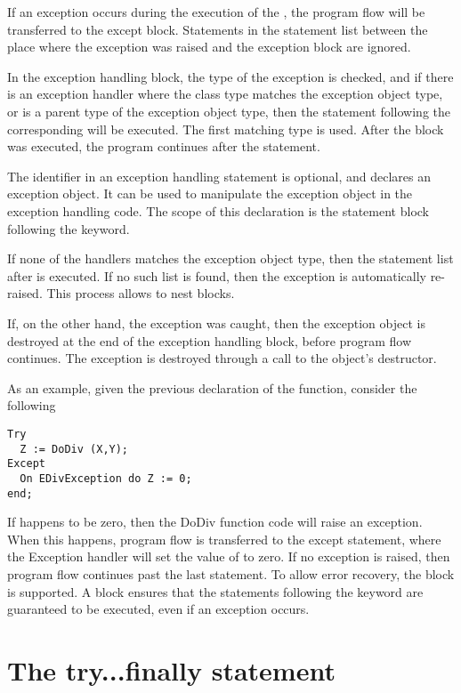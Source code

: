 If an exception occurs during the execution of the , the
program flow will be transferred to the except block. Statements in the
statement list between the place where the exception was raised and the
exception block are ignored.

In the exception handling block, the type of the exception is checked,
and if there is an exception handler where the class type matches the
exception object type, or is a parent type of
the exception object type, then the statement following the corresponding
 will be executed. The first matching type is used. After the
 block was executed, the program continues after the 
statement.

The identifier in an exception handling statement is optional, and declares
an exception object. It can be used to manipulate the exception object in
the exception handling code. The scope of this declaration is the statement
block following the  keyword.

If none of the  handlers matches the exception object type, then the
statement list after  is executed. If no such list is
found, then the exception is automatically re-raised. This process allows
to nest  blocks.

If, on the other hand, the exception was caught, then the exception object is
destroyed at the end of the exception handling block, before program flow
continues. The exception is destroyed through a call to the object's
 destructor.

As an example, given the previous declaration of the  function,
consider the following
\begin{verbatim}
Try
  Z := DoDiv (X,Y);
Except
  On EDivException do Z := 0;
end;
\end{verbatim}
If  happens to be zero, then the DoDiv function code will raise an
exception. When this happens, program flow is transferred to the except
statement, where the Exception handler will set the value of  to
zero. If no exception is raised, then program flow continues past the last
 statement.
To allow error recovery, the  block is supported.
A  block ensures that the statements following the
 keyword are guaranteed to be executed, even if an exception
occurs.


\section{The try...finally statement}
  

